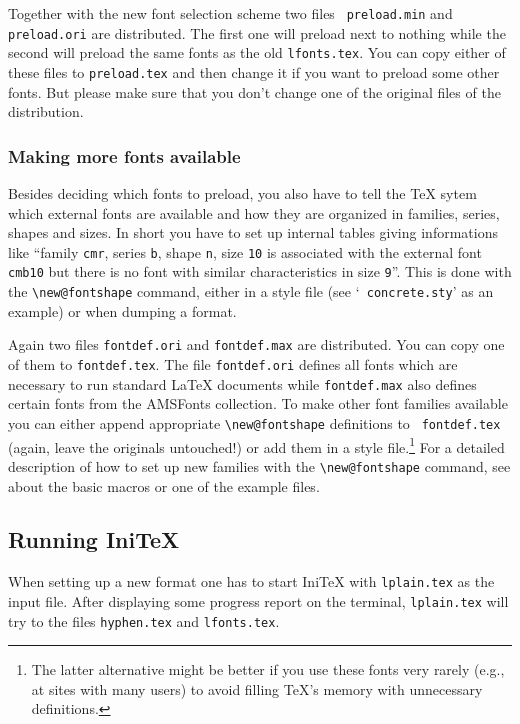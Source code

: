  Together with the new font selection scheme two files {\tt
 preload.min} and {\tt preload.ori} are distributed. The first one
 will preload next to nothing while the second will preload the same
 fonts as the old {\tt lfonts.tex}. You can copy either of these files
 to {\tt preload.tex} and then change it if you want to preload some
 other fonts. But please make sure that you don't change one of the
 original files of the distribution.
 
 
\subsubsection{Making more fonts available}
 
 Besides deciding which fonts to preload, you also have to tell the
 \TeX{} sytem which external fonts are available and how they are
 organized in families, series, shapes and sizes. In short you have to
 set up internal tables giving informations like ``family {\tt cmr},
 series {\tt b}, shape {\tt n}, size {\tt 10} is associated with the
 external font {\tt cmb10} but there is no font with similar
 characteristics in size {\tt 9}''. This is done with the
 \verb+\new@fontshape+ command, either in a style file (see `{\tt
 concrete.sty}' as an example) or when dumping a format.
 
 Again two files {\tt fontdef.ori} and {\tt fontdef.max} are
 distributed.  You can copy one of them to {\tt fontdef.tex}.  The
 file {\tt fontdef.ori} defines all fonts which are necessary to run
 standard \LaTeX{} documents while {\tt fontdef.max} also defines
 certain fonts from the AMSFonts collection.
 To make other font families available you can
 either append appropriate \verb+\new@fontshape+ definitions to {\tt
 fontdef.tex} (again, leave the originals untouched!) or add them in a
 style file.\footnote{The latter alternative might be better if you
 use these fonts very rarely (e.g., at sites with many users) to
 avoid filling \TeX{}'s memory with unnecessary definitions.} For a
 detailed description of how to set up new families with the
 \verb+\new@fontshape+ command, see \cite{basic} about the basic
 macros or one of the example files.
 
 
\subsection{Running Ini\TeX}
 
 When setting up a new format one has to start Ini\TeX{} with
 {\tt lplain.tex} as the input file. After displaying some progress
 report
 on the terminal, {\tt lplain.tex} will try to \verb++ the files
 {\tt hyphen.tex} and {\tt lfonts.tex}.
 
